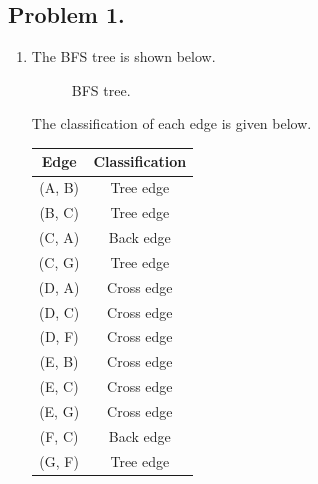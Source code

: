 \documentclass[11pt, letterpaper, titlepage]{article}
\begin{document}
\onehalfspacing

\subsection*{Problem 1.}
\begin{enumerate}[label=(\alph*)]
    \item The BFS tree is shown below.
    \begin{figure}[H]
        \centering
        \caption{BFS tree.}
    \end{figure}
    The classification of each edge is given below.
    \begin{tabularx}{\textwidth}{cc}
        \caption{Classification of each edge for the BFS tree.} \\
        \toprule
        \textbf{Edge} & \textbf{Classification} \\
        \midrule()
        (A, B) & Tree edge \\
        (B, C) & Tree edge \\
        (C, A) & Back edge \\
        (C, G) & Tree edge \\
        (D, A) & Cross edge \\
        (D, C) & Cross edge \\
        (D, F) & Cross edge \\
        (E, B) & Cross edge \\
        (E, C) & Cross edge \\
        (E, G) & Cross edge \\
        (F, C) & Back edge \\
        (G, F) & Tree edge \\
        \bottomrule
    \end{tabularx}


\end{enumerate}
\end{document}
